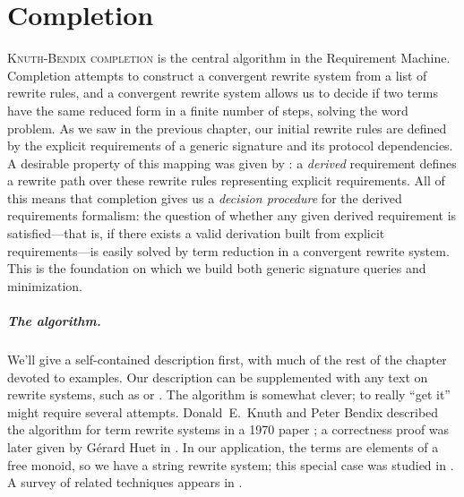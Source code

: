 \documentclass[../generics]{subfiles}
\begin{document}
\chapter{Completion}\label{completion}

%
\lettrine{K}{nuth-Bendix completion} is the central algorithm in the Requirement Machine. Completion attempts to construct a convergent rewrite system from a list of rewrite rules, and a convergent rewrite system allows us to decide if two terms have the same reduced form in a finite number of steps, solving the word problem. As we saw in the previous chapter, our initial rewrite rules are defined by the explicit requirements of a generic signature and its protocol dependencies. A desirable property of this mapping was given by : a \emph{derived} requirement defines a rewrite path over these rewrite rules representing explicit requirements. All of this means that completion gives us a \emph{decision procedure} for the derived requirements formalism: the question of whether any given derived requirement is satisfied---that is, if there exists a valid derivation built from explicit requirements---is easily solved by term reduction in a convergent rewrite system. This is the foundation on which we build both generic signature queries and minimization.

\paragraph{The algorithm.} We'll give a self-contained description first, with much of the rest of the chapter devoted to examples. Our description can be supplemented with any text on rewrite systems, such as \cite{book2012string} or \cite{andallthat}. The algorithm is somewhat clever; to really ``get it'' might require several attempts. Donald~E.~Knuth and Peter Bendix described the algorithm for term rewrite systems in a 1970 paper \cite{Knuth1983}; a correctness proof was later given by G\'erard Huet in \cite{HUET198111}. In our application, the terms are elements of a free monoid, so we have a string rewrite system; this special case was studied in \cite{narendran}. A survey of related techniques appears in \cite{BUCHBERGER19873}.
\end{document}
